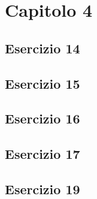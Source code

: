 \section{\textbf{Capitolo 4}}
\subsection{Esercizio 14}

\subsection{Esercizio 15}

\subsection{Esercizio 16}

\subsection{Esercizio 17}

\subsection{Esercizio 19}

